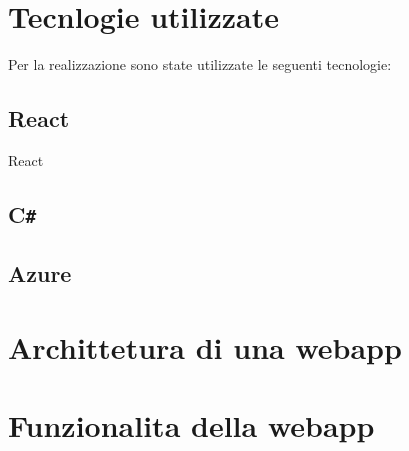\section{Tecnlogie utilizzate}
Per la realizzazione sono state utilizzate le seguenti tecnologie:
\subsection{React}
React 
\subsection{C\texttt{\#}}

\subsection{Azure}

\section{Archittetura di una webapp}

\section{Funzionalita della webapp}